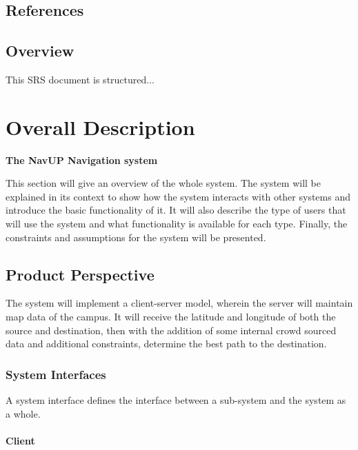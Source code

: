 \documentclass[12pt,a4paper]{article}
\begin{document}
		\subsection{References}

		\subsection{Overview}

			This SRS document is structured...

	\section{Overall Description}

		\begin{flushleft}
			\textbf{The NavUP Navigation system}
		\end{flushleft}
	
	\begin{flushleft}
		{\normalsize This section will give an overview of the whole system. The system will be explained in its 			context to show how the system interacts with other systems and introduce the basic functionality of it. It 			will also describe the type of users that will use the system and what functionality is available for each 			type. Finally, the constraints and assumptions for the system will be presented.}
	\end{flushleft}

		\subsection{Product Perspective}
		
			The system will implement a client-server model, wherein the server will maintain map 
			data of the campus. It will receive the latitude and longitude of both the source and 
			destination, then with the addition of some internal crowd sourced data and additional 
			constraints, determine the best path to the destination. 

			\subsubsection{System Interfaces}
			
				A system interface defines the interface between a sub-system and the system as a whole. 
			
				\paragraph{Client}
				
\end{document}
